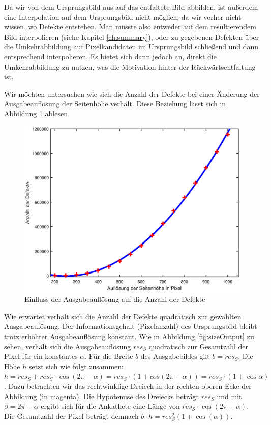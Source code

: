Da wir von dem Ursprungsbild aus auf das entfaltete Bild abbilden, ist außerdem eine Interpolation auf dem Ursprungsbild nicht möglich, da wir vorher nicht wissen, wo Defekte entstehen. Man müsste also entweder auf dem resultierendem Bild interpolieren (siehe Kapitel \ref{ch:summary}), oder zu gegebenen Defekten über die Umkehrabbildung auf Pixelkandidaten im Ursprungsbild schließend und dann entsprechend interpolieren.
Es bietet sich dann jedoch an, direkt die Umkehrabbildung zu nutzen, was die Motivation hinter der Rückwärtsentfaltung ist.

Wir möchten untersuchen wie sich die Anzahl der Defekte bei einer Änderung der Ausgabeauflösung der Seitenhöhe verhält. Diese Beziehung lässt sich in Abbildung \ref{fig:influenceRes} ablesen.
\begin{figure}[!htb]
	\centering
	\includegraphics[width=\textwidth]{images/numberOfHoles.eps}
	\caption{Einfluss der Ausgabeauflösung auf die Anzahl der Defekte}
	\label{fig:influenceRes}
\end{figure}

Wie erwartet verhält sich die Anzahl der Defekte quadratisch zur gewählten Ausgabeaufösung. Der Informationsgehalt (Pixelanzahl) des Ursprungsbild bleibt trotz erhöhter Ausgabeauflösung konstant. Wie in Abbildung \ref{fig:sizeOutput} zu sehen, verhält sich die Ausgabeauflösung $res_S$ quadratisch zur Gesamtzahl der Pixel für ein konstantes $\alpha$. Für die Breite $b$ des Ausgabebildes gilt $b = res_S$.
Die Höhe $h$ setzt sich wie folgt zusammen: $h = res_S + res_S\cdot\cos(2\pi-\alpha) = res_S\cdot(1 + cos(2\pi-\alpha)) = res_S\cdot(1+\cos\alpha)$. Dazu betrachten wir das rechtwinklige Dreieck in der rechten oberen Ecke der Abbildung (in magenta). Die Hypotenuse des Dreiecks beträgt $res_S$ und mit $\beta = 2\pi - \alpha$ ergibt sich für die Ankathete eine Länge von $res_S\cdot\cos(2\pi-\alpha)$. Die Gesamtzahl der Pixel beträgt demnach $b\cdot h = res_S^2(1+\cos(\alpha))$.

